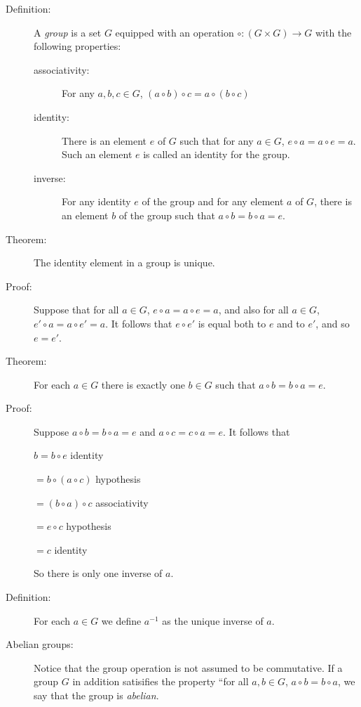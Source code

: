 \documentclass[12pt]{article}
\begin{document}
\begin{description}

\item[Definition:]  A {\em group} is a set $G$ equipped with an operation $\circ:(G \times G) \rightarrow G$ with the following properties:

\begin{description}

\item[associativity:]  For any $a,b,c \in G$, $(a \circ b) \circ c = a \circ (b \circ c)$

\item[identity:]  There is an element $e$ of $G$ such that for any $a \in G$, $e \circ a = a \circ e = a$.  Such an element $e$ is called an identity for the group.

\item[inverse:]  For any identity $e$ of the group and for any element $a$ of $G$, there is an element $b$ of the group such that $a \circ b = b \circ a = e$.

\end{description}


\item[Theorem:]  The identity element in a group is unique.

\item[Proof:]  Suppose that for all $a \in G$, $e \circ a = a \circ e = a$, and also for all $a \in G$, $e' \circ a = a \circ e' = a$.  It follows that $e \circ e'$ is equal both to $e$ and to $e'$, and so $e=e'$.

\item[Theorem:]  For each $a \in G$ there is exactly one $b \in G$ such that $a \circ b = b \circ a = e$.

\item[Proof:]  Suppose $a \circ b = b \circ a = e$ and $a \circ c = c \circ a = e$.  It follows that

$b = b \circ e$  identity

$= b \circ (a \circ c)$ hypothesis

$= (b \circ a) \circ c$  associativity

$= e \circ c$ hypothesis

$=c$  identity

So there is only one inverse of $a$.

\item[Definition:]  For each $a \in G$ we define $a ^{-1}$ as the unique inverse of $a$.

\item[Abelian groups:]  Notice that the group operation is not assumed to be commutative.  If a group $G$ in addition satisifies the property ``for all $a,b \in G$, $a \circ b = b \circ a$, we say that the group is {\em abelian\/}.


\end{description}
\end{document}
